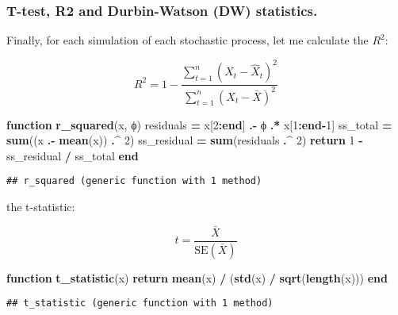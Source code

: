 \documentclass[
]{article}
\newenvironment{Shaded}{\begin{snugshade}}{\end{snugshade}}
\newcommand{\ControlFlowTok}[1]{\textcolor[rgb]{0.13,0.29,0.53}{\textbf{#1}}}
\newcommand{\FloatTok}[1]{\textcolor[rgb]{0.00,0.00,0.81}{#1}}
\newcommand{\FunctionTok}[1]{\textcolor[rgb]{0.13,0.29,0.53}{\textbf{#1}}}
\newcommand{\KeywordTok}[1]{\textcolor[rgb]{0.13,0.29,0.53}{\textbf{#1}}}
\newcommand{\NormalTok}[1]{#1}
\newcommand{\OperatorTok}[1]{\textcolor[rgb]{0.81,0.36,0.00}{\textbf{#1}}}
\begin{document}
\hypertarget{t-test-r2-and-durbin-watson-dw-statistics.}{%
\subsubsection{T-test, R2 and Durbin-Watson (DW)
statistics.}\label{t-test-r2-and-durbin-watson-dw-statistics.}}

Finally, for each simulation of each stochastic process, let me
calculate the \(R^2\):

\[
R^2 = 1 - \frac{\sum_{t=1}^{n} (X_t - \hat{X}_t)^2}{\sum_{t=1}^{n} (X_t - \bar{X})^2}
\]

\begin{Shaded}
\begin{Highlighting}[]
\KeywordTok{function} \FunctionTok{r\_squared}\NormalTok{(x, ϕ)}
\NormalTok{    residuals }\OperatorTok{=}\NormalTok{ x[}\FloatTok{2}\OperatorTok{:}\KeywordTok{end}\NormalTok{] }\OperatorTok{.{-}}\NormalTok{ ϕ }\OperatorTok{.*}\NormalTok{ x[}\FloatTok{1}\OperatorTok{:}\KeywordTok{end}\OperatorTok{{-}}\FloatTok{1}\NormalTok{]}
\NormalTok{    ss\_total }\OperatorTok{=} \FunctionTok{sum}\NormalTok{((x }\OperatorTok{.{-}} \FunctionTok{mean}\NormalTok{(x)) }\OperatorTok{.\^{}} \FloatTok{2}\NormalTok{)}
\NormalTok{    ss\_residual }\OperatorTok{=} \FunctionTok{sum}\NormalTok{(residuals }\OperatorTok{.\^{}} \FloatTok{2}\NormalTok{)}
    \ControlFlowTok{return} \FloatTok{1} \OperatorTok{{-}}\NormalTok{ ss\_residual }\OperatorTok{/}\NormalTok{ ss\_total}
\KeywordTok{end}
\end{Highlighting}
\end{Shaded}

\begin{verbatim}
## r_squared (generic function with 1 method)
\end{verbatim}

the t-statistic:

\[
t = \frac{\bar{X}}{\text{SE}(\bar{X})}
\]

\begin{Shaded}
\begin{Highlighting}[]
\KeywordTok{function} \FunctionTok{t\_statistic}\NormalTok{(x)}
    \ControlFlowTok{return} \FunctionTok{mean}\NormalTok{(x) }\OperatorTok{/}\NormalTok{ (}\FunctionTok{std}\NormalTok{(x) }\OperatorTok{/} \FunctionTok{sqrt}\NormalTok{(}\FunctionTok{length}\NormalTok{(x)))}
\KeywordTok{end}
\end{Highlighting}
\end{Shaded}

\begin{verbatim}
## t_statistic (generic function with 1 method)
\end{verbatim}
\end{document}
